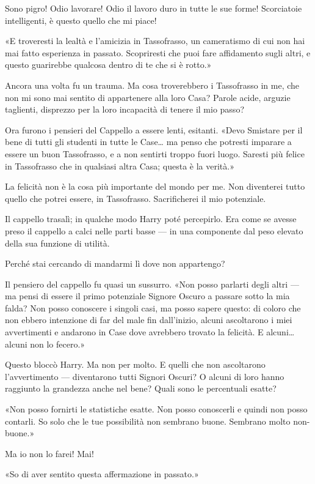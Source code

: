 Sono pigro! Odio lavorare! Odio il lavoro duro in tutte le sue forme! Scorciatoie intelligenti, è questo quello che mi piace!

«E troveresti la lealtà e l’amicizia in Tassofrasso, un cameratismo di cui non hai mai fatto esperienza in passato. Scopriresti che puoi fare affidamento sugli altri, e questo guarirebbe qualcosa dentro di te che si è rotto.»

Ancora una volta fu un trauma. Ma cosa troverebbero i Tassofrasso in me, che non mi sono mai sentito di appartenere alla loro Casa? Parole acide, arguzie taglienti, disprezzo per la loro incapacità di tenere il mio passo?

Ora furono i pensieri del Cappello a essere lenti, esitanti. «Devo Smistare per il bene di tutti gli studenti in tutte le Case… ma penso che potresti imparare a essere un buon Tassofrasso, e a non sentirti troppo fuori luogo. Saresti più felice in Tassofrasso che in qualsiasi altra Casa; questa è la verità.»

La felicità non è la cosa più importante del mondo per me. Non diventerei tutto quello che potrei essere, in Tassofrasso. Sacrificherei il mio potenziale.

Il cappello trasalì; in qualche modo Harry poté percepirlo. Era come se avesse preso il cappello a calci nelle parti basse — in una componente dal peso elevato della sua funzione di utilità.

Perché stai cercando di mandarmi lì dove non appartengo?

Il pensiero del cappello fu quasi un sussurro. «Non posso parlarti degli altri — ma pensi di essere il primo potenziale Signore Oscuro a passare sotto la mia falda? Non posso conoscere i singoli casi, ma posso sapere questo: di coloro che non ebbero intenzione di far del male fin dall’inizio, alcuni ascoltarono i miei avvertimenti e andarono in Case dove avrebbero trovato la felicità. E alcuni… alcuni non lo fecero.»

Questo bloccò Harry. Ma non per molto. E quelli che non ascoltarono l’avvertimento — diventarono tutti Signori Oscuri? O alcuni di loro hanno raggiunto la grandezza anche nel bene? Quali sono le percentuali esatte?

«Non posso fornirti le statistiche esatte. Non posso conoscerli e quindi non posso contarli. So solo che le tue possibilità non sembrano buone. Sembrano molto non-buone.»

Ma io non lo farei! Mai!

«So di aver sentito questa affermazione in passato.»

